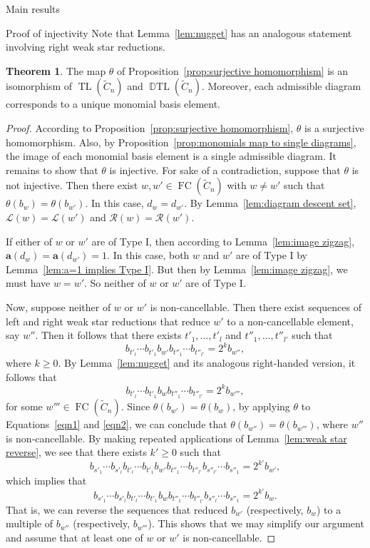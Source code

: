 \documentclass[11pt]{amsart}
\theoremstyle{definition}
\newtheorem{theorem}{Theorem}[section]
\numberwithin{equation}{section}
\newcommand{\C}{\widetilde{C}}
\renewcommand{\a}{\mathbf{a}}
\DeclareMathOperator{\TL}{TL}
\DeclareMathOperator{\DTL}{\mathbb{D}TL}
\renewcommand{\L}{\mathcal{L}}
\newcommand{\R}{\mathcal{R}}
\renewcommand{\(}{\left(}
\renewcommand{\)}{\right)}
\DeclareMathOperator{\FC}{FC}
\begin{document}
\begin{section}{Main results}
\begin{subsection}{Proof of injectivity}
Note that Lemma~\ref{lem:nugget} has an analogous statement involving right weak star reductions.

\begin{theorem}\label{thm:main result}
The map $\theta$ of Proposition~\ref{prop:surjective homomorphism} is an isomorphism of $\TL(\C_{n})$ and $\DTL(\C_n)$.  Moreover, each admissible diagram corresponds to a unique monomial basis element.
\end{theorem}

\begin{proof}
According to Proposition~\ref{prop:surjective homomorphism}, $\theta$ is a surjective homomorphism.  Also, by Proposition~\ref{prop:monomials map to single diagrams}, the image of each monomial basis element is a single admissible diagram.  It remains to show that $\theta$ is injective.  For sake of a contradiction, suppose  that $\theta$ is not injective.  Then there exist $w, w' \in \FC(\C_{n})$ with $w \neq w'$ such that $\theta(b_{w})=\theta(b_{w'})$.  In this case, $d_{w}=d_{w'}$.  By Lemma~\ref{lem:diagram descent set}, $\L(w)=\L(w')$ and $\R(w)=\R(w')$.  

If either of $w$ or $w'$ are of Type I, then according to Lemma~\ref{lem:image zigzag}, $\a(d_{w})=\a(d_{w'})=1$.  In this case, both $w$ and $w'$ are of Type I by Lemma~\ref{lem:a=1 implies Type I}.  But then by Lemma~\ref{lem:image zigzag}, we must have $w=w'$.  So neither of $w$ or $w'$ are of Type I.  

Now, suppose neither of $w$ or $w'$ is non-cancellable.  Then there exist sequences of left and right weak star reductions that reduce $w'$ to a non-cancellable element, say $w''$.  Then it follows that there exists $t'_1, \ldots, t'_l$ and $t''_1, \ldots, t''_{l'}$ such that
\begin{equation}\label{eqn1}
	b_{t'_{l}}\cdots b_{t'_{1}}b_{w'}b_{t''_{1}}\cdots b_{t''_{l'}}=2^{k}b_{w''},
\end{equation}
where $k\geq 0$.  By Lemma~\ref{lem:nugget} and its analogous right-handed version, it follows that
\begin{equation}\label{eqn2}
b_{t'_{l}}\cdots b_{t'_{1}}b_{w}b_{t''_{1}}\cdots b_{t''_{l'}}=2^{k}b_{w'''},
\end{equation}
for some $w''' \in \FC(\C_{n})$.  Since $\theta(b_{w'})=\theta(b_{w})$, by applying $\theta$ to Equations~\ref{eqn1} and \ref{eqn2}, we can  conclude that $\theta(b_{w''})=\theta(b_{w'''})$, where $w''$ is non-cancellable.  By making repeated applications of Lemma~\ref{lem:weak star reverse}, we see that there exists $k' \geq 0$ such that
\[
b_{s'_{1}}\cdots b_{s'_{l}}b_{t'_{l}}\cdots b_{t'_{1}}b_{w'}b_{t''_{1}}\cdots b_{t''_{l'}}b_{s''_{l'}}\cdots b_{s''_{1}}=2^{k'}b_{w'},
\]
which implies that
\[
b_{s'_{1}}\cdots b_{s'_{l}}b_{t'_{l}}\cdots b_{t'_{1}}b_{w}b_{t''_{1}}\cdots b_{t''_{l'}}b_{s''_{l}}\cdots b_{s''_{1}}=2^{k'}b_{w}.
\]
That is, we can reverse the sequences that reduced $b_{w'}$ (respectively, $b_{w}$) to a multiple of $b_{w''}$ (respectively, $b_{w'''}$).  This shows that we may simplify our argument and assume that at least one of $w$ or $w'$ is non-cancellable.  


\end{proof}
\end{subsection}
\end{section}
\end{document}
